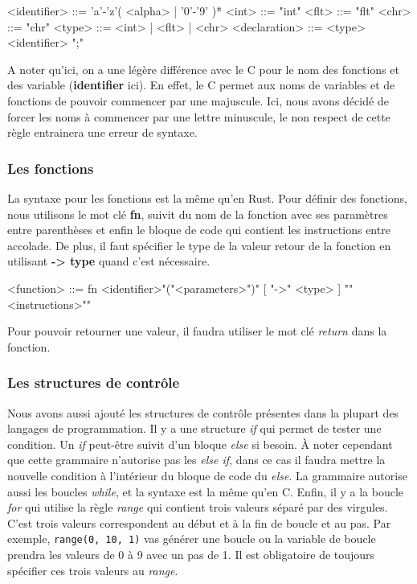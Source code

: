 \documentclass[a4paper]{article}%
\begin{document}
\begin{grammar}
<identifier> ::= 'a'-'z'( <alpha> | '0'-'9' )*
<int> ::= "int"
<flt> ::= "flt"
<chr> ::= "chr"
<type> ::= <int> | <flt> | <chr>
<declaration> ::= <type> <identifier> ";"
\end{grammar}\leavevmode\newline

A noter qu'ici, on a une légère différence avec le C pour le nom des fonctions
et des variable (\textbf{identifier} ici). En effet, le C permet aux noms de
variables et de fonctions de pouvoir commencer par une majuscule. Ici, nous
avons décidé de forcer les noms à commencer par une lettre minuscule, le non
respect de cette règle entrainera une erreur de syntaxe.

\subsubsection*{Les fonctions}

La syntaxe pour les fonctions est la même qu'en Rust. Pour définir des
fonctions, nous utilisons le mot clé \textbf{fn}, suivit du nom de la fonction
avec ses paramètres entre parenthèses et enfin le bloque de code qui contient
les instructions entre accolade. De plus, il faut spécifier le type de la valeur
retour de la fonction en utilisant \textbf{-> type} quand c'est nécessaire.

\begin{grammar}
<function> ::= fn <identifier>"("<parameters>")" [ "->" <type> ] "{"<instructions>"}"
\end{grammar}\leavevmode\newline

Pour pouvoir retourner une valeur, il faudra utiliser le mot clé \textit{return}
dans la fonction.

\subsubsection*{Les structures de contrôle}

Nous avons aussi ajouté les structures de contrôle présentes dans la plupart des
langages de programmation. Il y a une structure \textit{if} qui permet de tester
une condition. Un \textit{if} peut-être suivit d'un bloque \textit{else} si
besoin. À noter cependant que cette grammaire n'autorise pas les \textit{else
if}, dans ce cas il faudra mettre la nouvelle condition à l'intérieur du bloque
de code du \textit{else}. La grammaire autorise aussi les boucles
\textit{while}, et la syntaxe est la même qu'en C. Enfin, il y a la boucle
\textit{for} qui utilise la règle \textit{range} qui contient trois valeurs
séparé par des virgules. C'est trois valeurs correspondent au début et à la fin
de boucle et au pas. Par exemple, \lstinline{range(0, 10, 1)} vas générer une
boucle ou la variable de boucle prendra les valeurs de 0 à 9 avec un pas de 1.
Il est obligatoire de toujours spécifier ces trois valeurs au \textit{range}.
\end{document}
